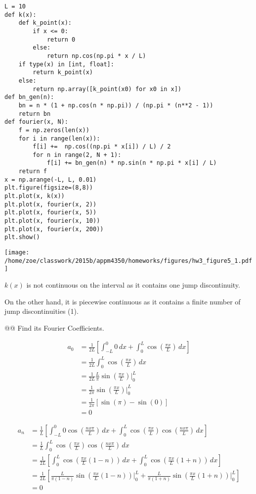 \documentclass[10pt]{article}
\begin{document}
\begin{easylist}[enumerate]
\begin{verbatim}
L = 10
def k(x):
    def k_point(x):
        if x <= 0:
            return 0
        else:
            return np.cos(np.pi * x / L)
    if type(x) in [int, float]:
        return k_point(x)
    else:
        return np.array([k_point(x0) for x0 in x])
def bn_gen(n):
    bn = n * (1 + np.cos(n * np.pi)) / (np.pi * (n**2 - 1))
    return bn
def fourier(x, N):
    f = np.zeros(len(x))
    for i in range(len(x)):
        f[i] +=  np.cos((np.pi * x[i]) / L) / 2
        for n in range(2, N + 1):
            f[i] += bn_gen(n) * np.sin(n * np.pi * x[i] / L)
    return f
x = np.arange(-L, L, 0.01)
plt.figure(figsize=(8,8))
plt.plot(x, k(x))
plt.plot(x, fourier(x, 2))
plt.plot(x, fourier(x, 5))
plt.plot(x, fourier(x, 10))
plt.plot(x, fourier(x, 200))
plt.show()
\end{verbatim}
\texttt{[image: /home/zoe/classwork/2015b/appm4350/homeworks/figures/hw3\_figure5\_1.pdf]}

\noweave

    $k(x)$ is not continuous on the interval as it contains one jump discontinuity.

    On the other hand, it is piecewise continuous as it contains a finite number of jump discontinuities (1).

    @@ Find its Fourier Coefficients.

    \begin{align*}
        a_0 &= \frac{1}{2L} \left[ \int_{-L}^0 0 \, dx + \int_0^L \cos\left(\frac{\pi x}{L}\right) \, dx \right]\\
            &= \frac{1}{2L} \int_0^L \cos\left(\frac{\pi x}{L}\right) \, dx\\
            &= \frac{1}{2L} \frac{L}{\pi} \sin\left(\frac{\pi x}{L}\right) \bigg|_0^L\\
            &= \frac{1}{2\pi} \sin\left(\frac{\pi x}{L}\right) \bigg|_0^L\\
            &= \frac{1}{2\pi} \left[ \sin(\pi) - \sin(0) \right]\\
            &= 0
    \end{align*}

    \begin{align*}
        a_n &= \frac{1}{L} \left[ \int_{-L}^0 0 \cos\left(\frac{nx\pi}{L}\right) \, dx + \int_0^L \cos\left(\frac{\pi x}{L}\right) \cos\left(\frac{nx\pi}{L}\right) \, dx \right]\\
            &= \frac{1}{L} \int_0^L \cos\left(\frac{\pi x}{L}\right) \cos\left(\frac{nx\pi}{L}\right) \, dx\\
            &= \frac{1}{2L} \left[\int_0^L \cos\left(\frac{\pi x}{L}(1 - n)\right) \, dx + \int_0^L \cos\left(\frac{\pi x}{L} (1 + n)\right) \, dx \right]\\
            &= \frac{1}{2L} \left[\frac{L}{\pi(1-n)}\sin\left(\frac{\pi x}{L}(1 - n)\right)\bigg|_0^L + \frac{L}{\pi(1+n)}\sin\left(\frac{\pi x}{L} (1 + n)\right)\bigg|_0^L \right]\\
            &= 0
    \end{align*}


\end{easylist}
\end{document}
